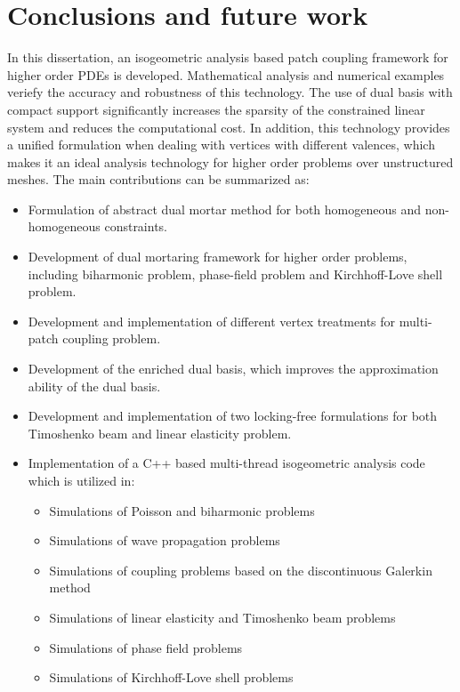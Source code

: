 \chapter{Conclusions and future work}
\label{chp:chapter7}
\graphicspath{{figures/}{figures/chapter6/}}

In this dissertation, an isogeometric analysis based patch coupling framework for higher order PDEs is developed. Mathematical analysis and numerical examples veriefy the accuracy and robustness of this technology. The use of dual basis with compact support significantly increases the sparsity of the constrained linear system and reduces the computational cost. In addition, this technology provides a unified formulation when dealing with vertices with different valences, which makes it an ideal analysis technology for higher order problems over unstructured meshes. The main contributions can be summarized as:
\begin{itemize}
  \item Formulation of abstract dual mortar method for both homogeneous and non-homogeneous constraints.
  \item Development of \Bezier dual mortaring framework for higher order problems, including biharmonic problem, phase-field problem and Kirchhoff-Love shell problem.
  \item Development and implementation of different vertex treatments for multi-patch coupling problem.
  \item Development of the enriched \Bezier dual basis, which improves the approximation ability of the \Bezier dual basis.
  \item Development and implementation of two locking-free formulations for both Timoshenko beam and linear elasticity problem. 
  \item Implementation of a C++ based multi-thread isogeometric analysis code which is utilized in:
  \begin{itemize}
    \item Simulations of Poisson and biharmonic problems
    \item Simulations of wave propagation problems
    \item Simulations of coupling problems based on the discontinuous Galerkin method
    \item Simulations of linear elasticity and Timoshenko beam problems
    \item Simulations of phase field problems
    \item Simulations of Kirchhoff-Love shell problems
  \end{itemize}
\end{itemize}

